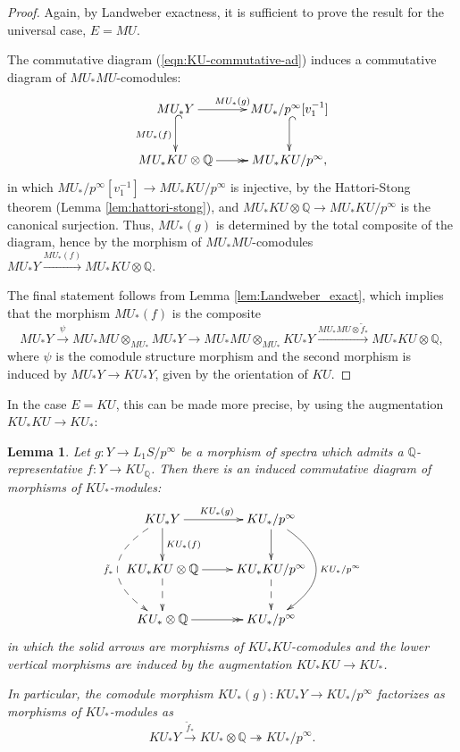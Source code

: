 \documentclass[10pt,a4paper]{amsart}
\newtheorem{lem}[thm]{Lemma}
\theoremstyle{definition}
\theoremstyle{remark}
\newcommand{\rat}{\mathbb{Q}}
\begin{document}
\begin{proof}
Again, by Landweber exactness, it  is sufficient to prove the result for the universal case, $E = MU$.

The commutative diagram (\ref{eqn:KU-commutative-ad}) induces a commutative diagram of $MU_* MU$-comodules:
\[
\xymatrix{
MU_* Y
\ar[r]^{MU_* (g)}
\ar@{^(->}[d]_{MU_*(f)}
&
MU_* /p^\infty [v_1 ^{-1}]
\ar@{^(->}[d]
\\
MU_*KU \otimes \rat
\ar@{->>}[r]
&
MU_* KU /p^\infty,
}
\]
in which $MU_* /p^\infty [v_1^{-1}] \rightarrow MU_* KU /p^\infty$ is
injective, by the Hattori-Stong theorem (Lemma \ref{lem:hattori-stong}),
 and $MU_* KU \otimes \rat \rightarrow
MU_* KU
/p^\infty$ is the canonical surjection. Thus, $MU_* (g)$ is determined by the
total composite of the diagram, hence by the morphism of $MU_*MU$-comodules
$MU_* Y \stackrel{MU_* (f)}{\rightarrow}MU_* KU \otimes
\rat$.

The final statement follows from Lemma \ref{lem:Landweber_exact}, which implies that the morphism $MU_*(f)$ is the composite
\[
	MU_* Y
	\stackrel{\psi}{\rightarrow}
	MU_* MU \otimes _{MU_*} MU_* Y
	\rightarrow
	MU_*MU \otimes _{MU_*} KU_* Y
	\stackrel{MU_* MU \otimes \tilde{f}_*}{\rightarrow}
	MU_*KU \otimes \rat,
\]
where $\psi$ is the comodule structure morphism and the second morphism is induced by $MU_* Y
\rightarrow KU_* Y$, given by the orientation of $KU$.
\end{proof}

In the case $E = KU$, this can be made more precise, by using the augmentation $KU_*KU \rightarrow KU_*$:

\begin{lem}
\label{lem:comodule-factorization}
Let $g: Y \rightarrow L_1 S /p^\infty$ be a morphism of spectra which admits a $\rat$-representative $f: Y \rightarrow KU_\rat$.
 Then there is an induced commutative diagram of
morphisms of $KU_*$-modules:
\[
 \xymatrix{
KU_* Y
\ar[r]^{KU_* (g)}
\ar[d]^{KU_* (f)}
\ar @{-->}@/_3pc/[dd]_{\tilde{f}_*}
&
KU_*/p^\infty
\ar[d]
\ar@/^3pc/[dd]^{KU_* /p^\infty}
\\
KU_*KU \otimes \rat
\ar[r]
\ar@{-->}[d]
&
KU_* KU/p^\infty
\ar@{-->}[d]
\\
KU_* \otimes \rat
\ar@{->>}[r]
&
KU_*/p^\infty
}
\]
in which the solid arrows are morphisms of $KU_*KU$-comodules and the lower
vertical morphisms are induced by the augmentation $KU_* KU \rightarrow KU_*$.

In particular, the comodule morphism $KU_* (g) : KU_* Y \rightarrow KU_*
/p^\infty$ factorizes as morphisms of $KU_*$-modules as
\[
 KU_ * Y
\stackrel{\tilde{f}_*} {\rightarrow}
KU_* \otimes \rat
\twoheadrightarrow
KU_* /p^\infty.
\]
\end{lem}
\end{document}
